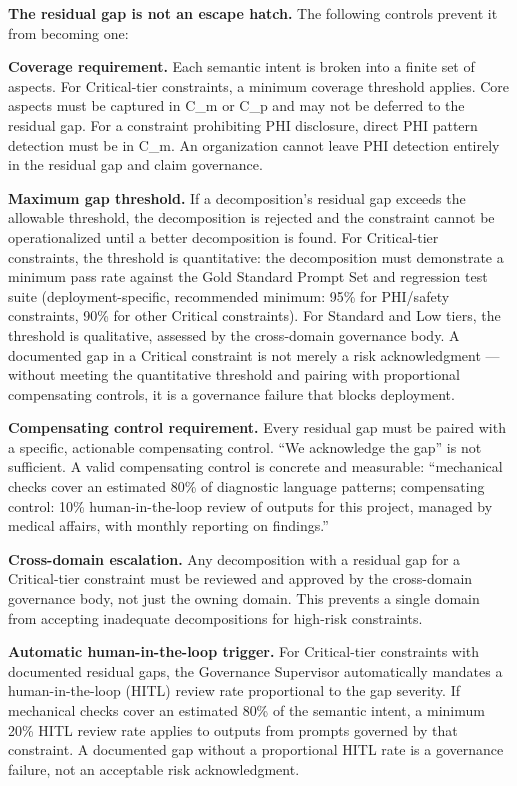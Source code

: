 \textbf{The residual gap is not an escape hatch.} The following controls prevent it from becoming one:

\textbf{Coverage requirement.} Each semantic intent is broken into a finite set of aspects. For Critical-tier constraints, a minimum coverage threshold applies. Core aspects must be captured in C\_\allowbreak{}m or C\_\allowbreak{}p and may not be deferred to the residual gap. For a constraint prohibiting PHI disclosure, direct PHI pattern detection must be in C\_\allowbreak{}m. An organization cannot leave PHI detection entirely in the residual gap and claim governance.

\textbf{Maximum gap threshold.} If a decomposition's residual gap exceeds the allowable threshold, the decomposition is rejected and the constraint cannot be operationalized until a better decomposition is found. For Critical-tier constraints, the threshold is quantitative: the decomposition must demonstrate a minimum pass rate against the Gold Standard Prompt Set and regression test suite (deployment-specific, recommended minimum: 95\% for PHI/safety constraints, 90\% for other Critical constraints). For Standard and Low tiers, the threshold is qualitative, assessed by the cross-domain governance body. A documented gap in a Critical constraint is not merely a risk acknowledgment --- without meeting the quantitative threshold and pairing with proportional compensating controls, it is a governance failure that blocks deployment.

\textbf{Compensating control requirement.} Every residual gap must be paired with a specific, actionable compensating control. ``We acknowledge the gap'' is not sufficient. A valid compensating control is concrete and measurable: ``mechanical checks cover an estimated 80\% of diagnostic language patterns; compensating control: 10\% human-in-the-loop review of outputs for this project, managed by medical affairs, with monthly reporting on findings.''

\textbf{Cross-domain escalation.} Any decomposition with a residual gap for a Critical-tier constraint must be reviewed and approved by the cross-domain governance body, not just the owning domain. This prevents a single domain from accepting inadequate decompositions for high-risk constraints.

\textbf{Automatic human-in-the-loop trigger.} For Critical-tier constraints with documented residual gaps, the Governance Supervisor automatically mandates a human-in-the-loop (HITL) review rate proportional to the gap severity. If mechanical checks cover an estimated 80\% of the semantic intent, a minimum 20\% HITL review rate applies to outputs from prompts governed by that constraint. A documented gap without a proportional HITL rate is a governance failure, not an acceptable risk acknowledgment.

